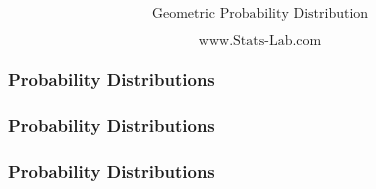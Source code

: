 \documentclass{beamer}
\begin{document}
\begin{frame}


\Large
\[ \mbox{Geometric Probability Distribution}  \]

\[ \mbox{www.Stats-Lab.com}\]


\end{frame}
\begin{frame}
\frametitle{Probability Distributions}


\end{frame}
\begin{frame}
\frametitle{Probability Distributions}


\end{frame}
\begin{frame}
\frametitle{Probability Distributions}


\end{frame}
\end{document}
